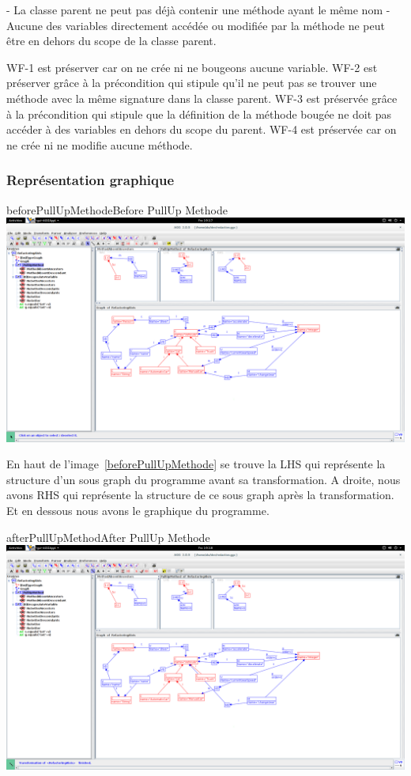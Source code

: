 \documentclass[a4paper, 10pt]{article}
\begin{document}
- La classe parent ne peut pas déjà contenir une méthode ayant le même nom
- Aucune des variables directement accédée ou modifiée par la méthode ne peut être en dehors du scope de la classe parent.

WF-1 est préserver car on ne crée ni ne bougeons aucune variable.
WF-2 est préserver grâce à la précondition qui stipule qu'il ne peut pas se trouver une méthode avec la même signature dans la classe parent.
WF-3 est préservée grâce à la précondition qui stipule que la définition de la méthode bougée ne doit pas accéder à des variables en dehors du scope du parent.
WF-4 est préservée car on ne crée ni ne modifie aucune méthode.

\subsubsection{Représentation graphique}

\begin{myfig}{beforePullUpMethode}{Before PullUp Methode}
\includegraphics[width=\textwidth]{beforePullUpMethode.png}
\end{myfig}

En haut de l'image~\ref{beforePullUpMethode} se trouve la LHS qui représente la structure d'un sous graph du programme avant sa transformation. A droite, nous avons RHS qui représente la structure de ce sous graph après la transformation. Et en dessous nous avons le graphique du programme.

\begin{myfig}{afterPullUpMethod}{After PullUp Methode}
\includegraphics[width=\textwidth]{afterPullUpMethod.png}
\end{myfig}
\end{document}
